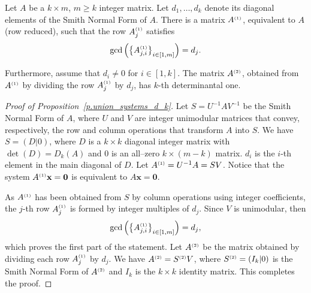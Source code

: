  \begin {proposition} 
  \label {p.union_systems_d_k} Let $A$ be a $k\times m$, $m\geq k$ integer matrix. Let $d_1,\ldots , d_k$ denote its diagonal elements of the Smith Normal Form of $A$. There is a matrix $A^{\text {\tiny {(1)}}}$, equivalent to $A$ (row reduced), such that the row $A_j^\text {\tiny {(1)}}$ satisfies \[\gcd \left (\left \{A_{j,i}^{\text {\tiny {(1)}}}\right \}_{i\in [1,m]}\right )=d_j.\] \par Furthermore, assume that $d_i\neq 0$ for $i\in [1,k]$. The matrix $A^{\text {\tiny {(2)}}}$, obtained from $A^{\text {\tiny {(1)}}}$ by dividing the row $A_j^\text {\tiny {(1)}}$ by $d_j$, has $k$-th determinantal one.
 \end {proposition} 
 
 \begin {proof} 
 [Proof of Proposition~\ref {p.union_systems_d_k}] Let $S=U^{-1}AV^{-1}$ be the Smith Normal Form of $A$, where $U$ and $V$ are integer unimodular matrices that convey, respectively, the row and column operations that transform $A$ into $S$. We have $S=\left (D|0\right )$, where $D$ is a $k\times k$ diagonal integer matrix with $\det (D)=D_k(A)$ and $0$ is an all--zero $k\times (m-k)$ matrix. $d_i$ is the $i$-th element in the main diagonal of $D$. Let $A^{\text {\tiny {(1)}}}=U^{-1}A=SV$. Notice that the system $A^{\text {\tiny {(1)}}}\textbf {x}=\mathbf {0}$ is equivalent to $A\textbf {x}=\mathbf {0}$. \par As $A^{\text {\tiny {(1)}}}$ has been obtained from $S$ by column operations using integer coefficients, the $j$-th row $A_j^\text {\tiny {(1)}}$ is formed by integer multiples of $d_j$. Since $V$ is unimodular, then \[\gcd \left (\left \{A_{j,i}^{\text {\tiny {(1)}}}\right \}_{i\in [1,m]}\right )=d_j,\] which proves the first part of the statement. Let $A^{\text {\tiny {(2)}}}$ be the matrix obtained by dividing each row $A_j^{\text {\tiny {(1)}}}$ by $d_j$. We have $A^{\text {\tiny {(2)}}}=S^{\text {\tiny {(2)}}}V$, where $S^{\text {\tiny {(2)}}}=\left (I_k|0\right )$ is the Smith Normal Form of $A^{\text {\tiny {(2)}}}$ and $I_k$ is the $k\times k$ identity matrix. This completes the proof.
 \end {proof} 
 
